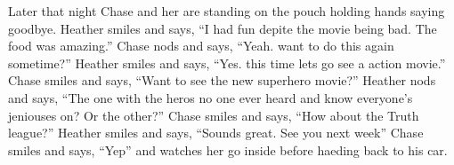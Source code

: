 \documentclass {article}[12pt]
\begin{document}
	Later that night Chase and her are standing on the pouch holding hands saying goodbye. Heather smiles and says, ``I had fun depite the movie being bad. The food was amazing.'' Chase nods and says, ``Yeah. want to do this again sometime?'' Heather smiles and says, ``Yes. this time lets go see a action movie.'' Chase smiles and says, ``Want to see the new superhero movie?'' Heather nods and says, ``The one with the heros no one ever heard and know everyone's jeniouses on? Or the other?'' Chase smiles and says, ``How about the Truth league?'' Heather smiles and says, ``Sounds great. See you next week'' Chase smiles and says, ``Yep'' and watches her go inside before haeding back to his car.
\end{document}

